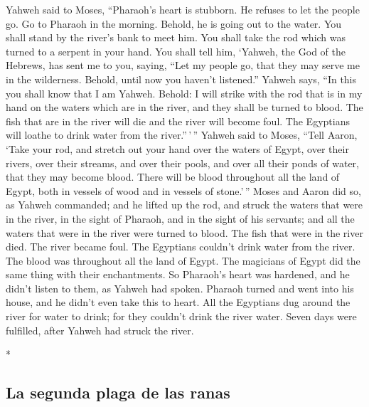 \begin{paracol}{2}
\begin{otherlanguage}{english}
 Yahweh said to Moses, ``Pharaoh's heart is stubborn. He
refuses to let the people go.  Go to Pharaoh in the
morning. Behold, he is going out to the water. You shall stand by the
river's bank to meet him. You shall take the rod which was turned to a
serpent in your hand.  You shall tell him, `Yahweh, the
God of the Hebrews, has sent me to you, saying, ``Let my people go, that
they may serve me in the wilderness. Behold, until now you haven't
listened.''  Yahweh says, ``In this you shall know that I
am Yahweh. Behold: I will strike with the rod that is in my hand on the
waters which are in the river, and they shall be turned to blood.
 The fish that are in the river will die and the river
will become foul. The Egyptians will loathe to drink water from the
river.''\,'\,''  Yahweh said to Moses, ``Tell Aaron,
`Take your rod, and stretch out your hand over the waters of Egypt, over
their rivers, over their streams, and over their pools, and over all
their ponds of water, that they may become blood. There will be blood
throughout all the land of Egypt, both in vessels of wood and in vessels
of stone.'\,''  Moses and Aaron did so, as Yahweh
commanded; and he lifted up the rod, and struck the waters that were in
the river, in the sight of Pharaoh, and in the sight of his servants;
and all the waters that were in the river were turned to blood.
 The fish that were in the river died. The river became
foul. The Egyptians couldn't drink water from the river. The blood was
throughout all the land of Egypt.  The magicians of Egypt
did the same thing with their enchantments. So Pharaoh's heart was
hardened, and he didn't listen to them, as Yahweh had spoken.
 Pharaoh turned and went into his house, and he didn't
even take this to heart.  All the Egyptians dug around
the river for water to drink; for they couldn't drink the river water.
 Seven days were fulfilled, after Yahweh had struck the
river.

\end{otherlanguage}

\switchcolumn[0]*

\hypertarget{la-segunda-plaga-de-las-ranas}{%
\subsection{La segunda plaga de las
ranas}\label{la-segunda-plaga-de-las-ranas}}


\end{paracol}
